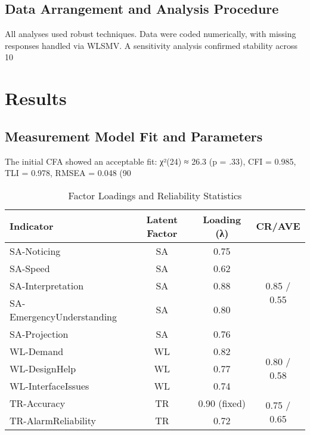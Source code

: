 \documentclass[conference]{IEEEtran}
\begin{document}
\subsection{Data Arrangement and Analysis Procedure}
All analyses used robust techniques. Data were coded numerically, with missing responses handled via WLSMV. A sensitivity analysis confirmed stability across 10%

\section{Results}
\subsection{Measurement Model Fit and Parameters}
The initial CFA showed an acceptable fit: χ²(24) ≈ 26.3 (p = .33), CFI = 0.985, TLI = 0.978, RMSEA = 0.048 (90%

\begin{table}[h]
\caption{Factor Loadings and Reliability Statistics}
\begin{tabular}{lccc}
\toprule
Indicator & Latent Factor & Loading (λ) & CR/AVE \\
\midrule
SA-Noticing & SA & 0.75 & \multirow{5}{*}{0.85 / 0.55} \\
SA-Speed & SA & 0.62 & \\
SA-Interpretation & SA & 0.88 & \\
SA-EmergencyUnderstanding & SA & 0.80 & \\
SA-Projection & SA & 0.76 & \\
WL-Demand & WL & 0.82 & \multirow{3}{*}{0.80 / 0.58} \\
WL-DesignHelp & WL & 0.77 & \\
WL-InterfaceIssues & WL & 0.74 & \\
TR-Accuracy & TR & 0.90 (fixed) & \multirow{2}{*}{0.75 / 0.65} \\
TR-AlarmReliability & TR & 0.72 & \\
\bottomrule
\end{tabular}
\end{table}
\end{document}
